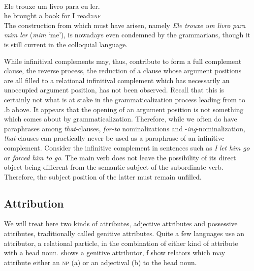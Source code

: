 \ea\label{ex:E36}
\langinfo{\LangPort}{}{} \\
\gll Ele  trouxe  um  livro  para  eu  ler.\\
he  brought  a  book  for  I  read:\textsc{inf}\\
\z
\noindent The construction from which  must have arisen, namely \textit{Ele trouxe um livro para mim ler} (\textit{mim} ‘me’), is nowadays even condemned by the grammarians, though it is still current in the colloquial language.

\label{page73}While infinitival complements may, thus, contribute to form a full complement clause, the reverse process, the reduction of a clause whose argument positions are all filled to a relational infinitival complement which has necessarily an unoccupied argument position, has not been observed. Recall that this is certainly not what is at stake in the grammaticalization process leading from  to .b above. It appears that the opening of an argument position is not something which comes about by grammaticalization. Therefore, while we often do have paraphrases among \textit{that}{}-clauses, \textit{for-to} nominalizations and -\textit{ing}{}-nominalization, \textit{that}{}-clauses can practically never be used as a paraphrase of an infinitive complement. Consider the infinitive complement in sentences such as \textit{I let him go} or \textit{forced him to go}. The main verb does not leave the possibility of its direct object being different from the semantic subject of the subordinate verb. Therefore, the subject position of the latter must remain unfilled.

\subsection{Attribution} \label{sec:3.3.3}

We will treat here two kinds of attributes, adjective attributes and possessive attributes, traditionally called genitive attributes. Quite a few languages use an attributor, a relational particle, in the combination of either kind of attribute with a head noun.  shows a genitive attributor, f show relators which may attribute either an \textsc{np} (a) or an adjectival (b) to the head noun.


